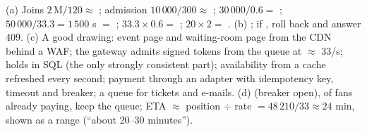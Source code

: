  (a) Joins $2\,\text{M}/120 \approx$ ; admission $10\,000/300 \approx$ ; $30\,000/0.6 =$ ; $50\,000/33.3 = 1\,500$ s $=$ ; $33.3 \times 0.6 =$ ; $20 \times 2 =$ . (b) ; if , roll back and answer 409. (c) A good drawing: event page and waiting-room page from the CDN behind a WAF; the gateway admits signed tokens from the queue at $\approx$ 33/s; holds in SQL (the only strongly consistent part); availability from a cache refreshed every second; payment through an adapter with idempotency key, timeout and breaker; a queue for tickets and e-mails. (d)  (breaker open),  of fans already paying, keep the queue; ETA $\approx$ position $\div$ rate $= 48\,210/33 \approx 24$ min, shown as a range (``about 20--30 minutes'').
